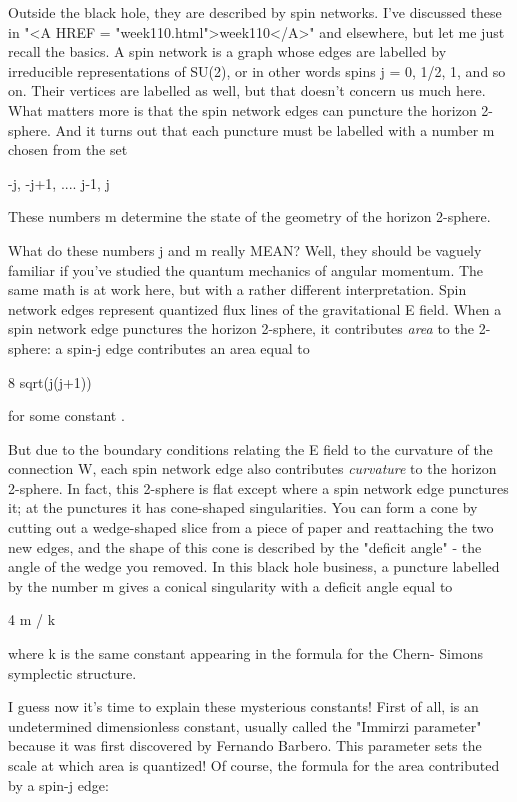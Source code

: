Outside the black hole, they are described by spin networks.  I've
discussed these in "<A HREF = "week110.html">week110</A>" and
elsewhere, but let me just recall the basics.  A spin network is a graph
whose edges are labelled by irreducible representations of SU(2), or in
other words spins j = 0, 1/2, 1, and so on.  Their vertices are labelled
as well, but that doesn't concern us much here.  What matters more is
that the spin network edges can puncture the horizon 2-sphere.  And it
turns out that each puncture must be labelled with a number m chosen
from the set

                       {-j, -j+1, .... j-1, j}

These numbers m determine the state of the geometry of the horizon 
2-sphere. 

What do these numbers j and m really MEAN?  Well, they should be vaguely 
familiar if you've studied the quantum mechanics of angular momentum.  
The same math is at work here, but with a rather different interpretation.  
Spin network edges represent quantized flux lines of the gravitational 
E field.  When a spin network edge punctures the horizon 2-sphere, it
contributes \emph{area} to the 2-sphere: a spin-j edge contributes an area 
equal to 

                      8 \pi  \gamma  sqrt(j(j+1))

for some constant \gamma .


But due to the boundary conditions relating the E field to the curvature of 
the connection W, each spin network edge also contributes \emph{curvature} to 
the horizon 2-sphere.  In fact, this 2-sphere is flat except where a spin 
network edge punctures it; at the punctures it has cone-shaped singularities.  
You can form a cone by cutting out a wedge-shaped slice from a piece of 
paper and reattaching the two new edges, and the shape of this cone is 
described by the "deficit angle" - the angle of the wedge 
you removed.  In this black hole business, a puncture labelled by the 
number m gives a conical singularity with a deficit angle equal to 

                         4 \pi  m / k

where k is the same constant appearing in the formula for the Chern-
Simons symplectic structure. 

I guess now it's time to explain these mysterious constants!  First of 
all, \gamma  is an undetermined dimensionless constant, usually called 
the "Immirzi parameter" because it was first discovered by Fernando 
Barbero.   This parameter sets the scale at which area is quantized!  
Of course, the formula for the area contributed by a spin-j edge:

